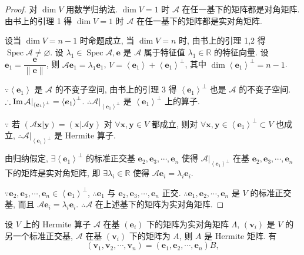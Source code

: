 \documentclass{ctexart}
\begin{document}
\begin{proof}
    对 $\dim V$ 用数学归纳法. $\dim V=1$ 时 $\mathcal{A}$ 在任一基下的矩阵都是对角矩阵. 由书上的引理 1 得 $\dim V=1$ 时 $\mathcal{A}$ 在任一基下的矩阵都是实对角矩阵.

    设当 $\dim V=n-1$ 时命题成立, 当 $\dim V=n$ 时, 由书上的引理 1,2 得 $\operatorname{Spec}\mathcal{A}\neq\varnothing$. 设 $\lambda_1\in\operatorname{Spec}\mathcal{A},\boldsymbol{e}$ 是 $\mathcal{A}$ 属于特征值 $\lambda_1\in\mathbb{R}$ 的特征向量. 设 $\boldsymbol{e}_1=\dfrac{\boldsymbol{e}}{\|\boldsymbol{e}\|}$, 则 $\mathcal{A}\boldsymbol{e}_1=\lambda_1\boldsymbol{e}_1$, $V=\left<\boldsymbol{e}_1\right>+\left<\boldsymbol{e}_1\right>^\perp$, 其中 $\dim\left<\boldsymbol{e}_1\right>^\perp=n-1$.

    $\because\left<\boldsymbol{e}_1\right>$ 是 $\mathcal{A}$ 的不变子空间, 由书上的引理 3 得 $\left<\boldsymbol{e}_1\right>^\perp$ 也是 $\mathcal{A}$ 的不变子空间. $\therefore\operatorname{Im} \mathcal{A}|_{\left<\boldsymbol{e}_1\right>^\perp}=\left<\boldsymbol{e}_1\right>^\perp$. $\therefore\mathcal{A}|_{\left<\boldsymbol{e}_1\right>^\perp}$ 是 $\left<\boldsymbol{e}_1\right>^\perp$ 上的算子.

    $\because$ 若 $(\mathcal{A}\boldsymbol{x}|\boldsymbol{y})=(\boldsymbol{x}|\mathcal{A}\boldsymbol{y})$ 对 $\forall\boldsymbol{x},\boldsymbol{y}\in V$ 都成立, 则对 $\forall\boldsymbol{x},\boldsymbol{y}\in\left<\boldsymbol{e}_1\right>^\perp\subset V$ 也成立, $\therefore\mathcal{A}|_{\left<\boldsymbol{e}_1\right>^\perp}$ 是 Hermite 算子.

    由归纳假定, $\exists\left<\boldsymbol{e}_1\right>^\perp$ 的标准正交基 $\boldsymbol{e}_2,\boldsymbol{e}_3,\cdots,\boldsymbol{e}_n$ 使得 $\mathcal{A}|_{\left<\boldsymbol{e}_1\right>^\perp}$ 在基 $\boldsymbol{e}_2,\boldsymbol{e}_3,\cdots,\boldsymbol{e}_n$ 下的矩阵是实对角矩阵, 即 $\exists\lambda_i\in\mathbb{R}$ 使得 $\mathcal{A}\boldsymbol{e}_i=\lambda_i\boldsymbol{e}_i$.

    $\because\boldsymbol{e}_2,\boldsymbol{e}_3,\cdots,\boldsymbol{e}_n\in\left<\boldsymbol{e}_1\right>^\perp$, $\therefore\boldsymbol{e}_1$ 与 $\boldsymbol{e}_2,\boldsymbol{e}_3,\cdots,\boldsymbol{e}_n$ 正交. $\therefore\boldsymbol{e}_1,\boldsymbol{e}_2,\cdots,\boldsymbol{e}_n$ 是 $V$ 的标准正交基, 而且 $\mathcal{A}\boldsymbol{e}_i=\lambda_i\boldsymbol{e}_i$. $\therefore\mathcal{A}$ 在上述基下的矩阵为实对角矩阵.
\end{proof}
设 $V$ 上的 Hermite 算子 $\mathcal{A}$ 在基 $(\boldsymbol{e}_i)$ 下的矩阵为实对角矩阵 $\Lambda$, $(\boldsymbol{v}_i)$ 是 $V$ 的另一个标准正交基, $\mathcal{A}$ 在基 $(\boldsymbol{v}_i)$ 下的矩阵为 $A$, 则 $A$ 是 Hermite 矩阵. 有
\[(\boldsymbol{v}_1,\boldsymbol{v}_2,\cdots,\boldsymbol{v}_n)=(\boldsymbol{e}_1,\boldsymbol{e}_2,\cdots,\boldsymbol{e}_n)B,\]
\end{document}
